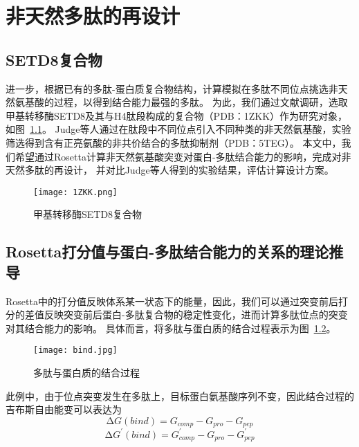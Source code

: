 
\chapter{非天然多肽的再设计}



\section{SETD8复合物}

进一步，根据已有的多肽-蛋白质复合物结构，计算模拟在多肽不同位点挑选非天然氨基酸的过程，以得到结合能力最强的多肽。
为此，我们通过文献调研，选取甲基转移酶SETD8及其与H4肽段构成的复合物（PDB：1ZKK）作为研究对象，如图~\ref{fig:complex}。
Judge等人\cite{RN118}通过在肽段中不同位点引入不同种类的非天然氨基酸，实验筛选得到含有正亮氨酸的非共价结合的多肽抑制剂（PDB：5TEG）。
本文中，我们希望通过Rosetta计算非天然氨基酸突变对蛋白-多肽结合能力的影响，完成对非天然多肽的再设计，
并对比Judge等人得到的实验结果，评估计算设计方案。
\begin{figure}
  \centering
  \texttt{[image: 1ZKK.png]}
  \caption{甲基转移酶SETD8复合物}
  \label{fig:complex}
\end{figure}


\section{Rosetta打分值与蛋白-多肽结合能力的关系的理论推导}

Rosetta中的打分值反映体系某一状态下的能量，因此，我们可以通过突变前后打分的差值反映突变前后蛋白-多肽复合物的稳定性变化，进而计算多肽位点的突变对其结合能力的影响。
具体而言，将多肽与蛋白质的结合过程表示为图~\ref{fig:bind}。
\begin{figure}
  \centering
  \texttt{[image: bind.jpg]}
  \caption{多肽与蛋白质的结合过程}
  \label{fig:bind}
\end{figure}

此例中，由于位点突变发生在多肽上，目标蛋白氨基酸序列不变，因此结合过程的吉布斯自由能变可以表达为
\begin{equation}
  \increment G(bind)=G_{comp}-G_{pro}-G_{pep}
  \label{eq:G_before_mutate}
\end{equation}
\begin{equation}
  \increment G^{'}(bind)=G_{comp}^{'}-G_{pro}-G_{pep}^{'}
  \label{eq:G_after_mutate}
\end{equation}

